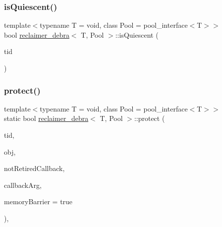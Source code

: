 \subsubsection{\texorpdfstring{is\+Quiescent()}{isQuiescent()}}
{\footnotesize\ttfamily template$<$typename T  = void, class Pool  = pool\+\_\+interface$<$\+T$>$$>$ \\
bool \hyperlink{classreclaimer__debra}{reclaimer\+\_\+debra}$<$ T, Pool $>$\+::is\+Quiescent (\begin{DoxyParamCaption}\item[{const int}]{tid }\end{DoxyParamCaption})\hspace{0.3cm}{\ttfamily [inline]}}

\mbox{\label{classreclaimer__debra_abfaa37584aefd85c5d4e3cba79e6d50c}} 
\subsubsection{\texorpdfstring{protect()}{protect()}}
{\footnotesize\ttfamily template$<$typename T  = void, class Pool  = pool\+\_\+interface$<$\+T$>$$>$ \\
static bool \hyperlink{classreclaimer__debra}{reclaimer\+\_\+debra}$<$ T, Pool $>$\+::protect (\begin{DoxyParamCaption}\item[{const int}]{tid,  }\item[{T $\ast$const}]{obj,  }\item[{\hyperlink{globals_8h_a57f5c0d40b156d7d996492fb2f16e3cd}{Callback\+Type}}]{not\+Retired\+Callback,  }\item[{\hyperlink{globals_8h_a3de64ef48066ac6430631c8b81a15345}{Callback\+Arg}}]{callback\+Arg,  }\item[{bool}]{memory\+Barrier = {\ttfamily true} }\end{DoxyParamCaption})\hspace{0.3cm}{\ttfamily [inline]}, {\ttfamily [static]}}

\mbox{\label{classreclaimer__debra_a24d0ee36a77ccf91e6923c2c535e26eb}} 
